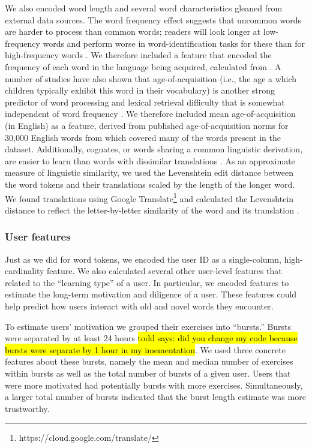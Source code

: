 \documentclass[11pt,a4paper]{article}
\begin{document}
We also encoded word length and several word characteristics gleaned from
external data sources. The word frequency effect suggests that uncommon words are harder to process than common words; readers will look longer at low-frequency words and perform worse in word-identification tasks for these than for high-frequency words \cite{rayner1998eye}. We therefore included a feature that encoded the frequency of each word in the language being acquired, calculated from \citet{robert_speer_2017_998161}. A number of studies have also shown that age-of-acquisition (i.e., the age a which children typically exhibit this word in their vocabulary) is another strong predictor of word processing and lexical retrieval difficulty that is somewhat independent of word frequency \cite{brysbaert2011effects, ferrand2011comparing}. We therefore included mean age-of-acquisition (in English) as a feature, derived from published age-of-acquisition norms for 30,000 English words from \cite{Kuperman2012} which covered many of the words present in the dataset. Additionally, cognates, or words sharing a common linguistic derivation, are easier to learn than words with dissimilar translations \cite{de2000hard}. As an approximate measure of linguistic similarity, we used the Levenshtein edit distance between the word tokens and their translations scaled by the length of the longer word. We found translations using Google Translate\footnote{https://cloud.google.com/translate/} and calculated the Levenshtein distance to reflect the letter-by-letter similarity of the word and its translation \cite{hyyro2001explaining}. 

\subsubsection{User features}

Just as we did for word tokens, we encoded the user ID as a single-column,
high-cardinality feature. We also calculated several other user-level features that related to the ``learning type'' of a user. In particular, we encoded features to estimate the long-term motivation and diligence of a user. These features could help predict how users interact with old and novel words they encounter.

To estimate users' motivation we grouped their exercises into ``bursts.'' Bursts were separated by at least 24 hours \hl{todd says: did you change my code because bursts were separate by 1 hour in my imementation}.  We used three concrete features about these bursts, namely the mean and median number of exercises within bursts as well as the total number of bursts of a given user. Users that were more motivated had potentially bursts with more exercises. Simultaneously, a larger total number of bursts indicated that the burst length estimate was more trustworthy.
\end{document}
